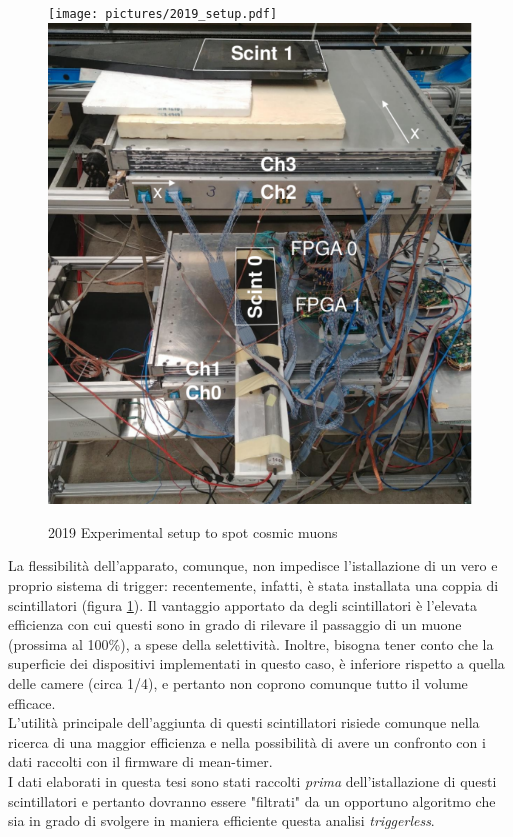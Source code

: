 \documentclass[a4paper,11pt]{book}
\begin{document}
\begin{figure}[hbtp]
\centering
\texttt{[image: pictures/2019\_setup.pdf]}
\includegraphics[scale=0.5]{pictures/2019_scint.pdf}
\caption{2019 Experimental setup to spot cosmic muons}
\label{fig:2019_esp_setup}
\end{figure}

La flessibilità dell'apparato, comunque, non impedisce l'istallazione di un vero e proprio sistema di trigger: recentemente, infatti, è stata installata una coppia di scintillatori (figura \ref{fig:2019_esp_setup}). Il vantaggio apportato da degli scintillatori è l'elevata efficienza con cui questi sono in grado di rilevare il passaggio di un muone (prossima al 100\%), a spese della selettività. Inoltre, bisogna tener conto che la superficie dei dispositivi implementati in questo caso, è inferiore rispetto a quella delle camere (circa 1/4), e pertanto non coprono comunque tutto il volume efficace.\\ 
L'utilità principale dell'aggiunta di questi scintillatori risiede comunque nella ricerca di una maggior efficienza e nella possibilità di avere un confronto con i dati raccolti con il firmware di mean-timer.\\
I dati elaborati in questa tesi sono stati raccolti \textit{prima} dell'istallazione di questi scintillatori e pertanto dovranno essere "filtrati" da un opportuno algoritmo che sia in grado di svolgere in maniera efficiente questa analisi \textit{triggerless}.\\
\end{document}
